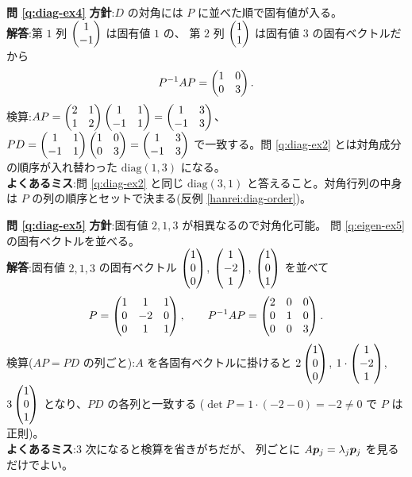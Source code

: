 \bigskip
\noindent\textbf{問 \ref{q:diag-ex4}}\quad
\textbf{方針}:$D$ の対角には $P$ に並べた順で固有値が入る。\\
\textbf{解答}:第 $1$ 列 $\begin{pmatrix}1 \\ -1\end{pmatrix}$ は固有値 $1$ の、
第 $2$ 列 $\begin{pmatrix}1 \\ 1\end{pmatrix}$ は固有値 $3$ の固有ベクトルだから
\[
P^{-1}AP = \begin{pmatrix}1 & 0 \\ 0 & 3\end{pmatrix}.
\]
検算:$AP = \begin{pmatrix}2 & 1 \\ 1 & 2\end{pmatrix}\begin{pmatrix}1 & 1 \\ -1 & 1\end{pmatrix} = \begin{pmatrix}1 & 3 \\ -1 & 3\end{pmatrix}$、
$PD = \begin{pmatrix}1 & 1 \\ -1 & 1\end{pmatrix}\begin{pmatrix}1 & 0 \\ 0 & 3\end{pmatrix} = \begin{pmatrix}1 & 3 \\ -1 & 3\end{pmatrix}$
で一致する。問 \ref{q:diag-ex2} とは対角成分の順序が入れ替わった
$\mathrm{diag}(1, 3)$ になる。\\
\textbf{よくあるミス}:問 \ref{q:diag-ex2} と同じ
$\mathrm{diag}(3, 1)$ と答えること。対角行列の中身は
$P$ の列の順序とセットで決まる(反例 \ref{hanrei:diag-order})。

\bigskip
\noindent\textbf{問 \ref{q:diag-ex5}}\quad
\textbf{方針}:固有値 $2, 1, 3$ が相異なるので対角化可能。
問 \ref{q:eigen-ex5} の固有ベクトルを並べる。\\
\textbf{解答}:固有値 $2, 1, 3$ の固有ベクトル
$\begin{pmatrix}1 \\ 0 \\ 0\end{pmatrix}$, $\begin{pmatrix}1 \\ -2 \\ 1\end{pmatrix}$, $\begin{pmatrix}1 \\ 0 \\ 1\end{pmatrix}$ を並べて
\[
P = \begin{pmatrix}1 & 1 & 1 \\ 0 & -2 & 0 \\ 0 & 1 & 1\end{pmatrix}, \qquad
P^{-1}AP = \begin{pmatrix}2 & 0 & 0 \\ 0 & 1 & 0 \\ 0 & 0 & 3\end{pmatrix}.
\]
検算($AP = PD$ の列ごと):$A$ を各固有ベクトルに掛けると
$2\begin{pmatrix}1 \\ 0 \\ 0\end{pmatrix}$, $1 \cdot \begin{pmatrix}1 \\ -2 \\ 1\end{pmatrix}$,
$3\begin{pmatrix}1 \\ 0 \\ 1\end{pmatrix}$ となり、$PD$ の各列と一致する
($\det P = 1 \cdot (-2 - 0) = -2 \neq 0$ で $P$ は正則)。\\
\textbf{よくあるミス}:$3$ 次になると検算を省きがちだが、
列ごとに $A\bm{p}_j = \lambda_j\bm{p}_j$ を見るだけでよい。

